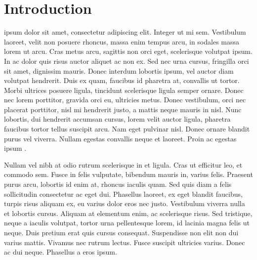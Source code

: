 \section{Introduction}\label{sec:10-intro}%
 ipsum dolor sit amet, consectetur adipiscing elit. Integer ut mi sem. Vestibulum laoreet, velit non posuere rhoncus, massa enim tempus arcu, in sodales massa lorem ut arcu. Cras metus arcu, sagittis non orci eget, scelerisque volutpat ipsum. In ac dolor quis risus auctor aliquet ac non ex. Sed nec urna cursus, fringilla orci sit amet, dignissim mauris. Donec interdum lobortis ipsum, vel auctor diam volutpat hendrerit. Duis ex quam, faucibus id pharetra at, convallis ut tortor. Morbi ultrices posuere ligula, tincidunt scelerisque ligula semper ornare. Donec nec lorem porttitor, gravida orci eu, ultricies metus. Donec vestibulum, orci nec placerat porttitor, nisl mi hendrerit justo, a mattis neque mauris in nisl. Nunc lobortis, dui hendrerit accumsan cursus, lorem velit auctor ligula, pharetra faucibus tortor tellus suscipit arcu. Nam eget pulvinar nisl. Donec ornare blandit purus vel viverra. Nullam egestas convallis neque et laoreet. Proin ac egestas ipsum \dummy.



Nullam vel nibh at odio rutrum scelerisque in et ligula. Cras ut efficitur leo, et commodo sem. Fusce in felis vulputate, bibendum mauris in, varius felis. Praesent purus arcu, lobortis id enim at, rhoncus iaculis quam. Sed quis diam a felis sollicitudin consectetur ac eget dui. Phasellus laoreet, ex eget blandit faucibus, turpis risus aliquam ex, eu varius dolor eros nec justo. Vestibulum viverra nulla et lobortis cursus. Aliquam at elementum enim, ac scelerisque risus. Sed tristique, neque a iaculis volutpat, tortor urna pellentesque lorem, id lacinia magna felis ut neque. Duis pretium erat quis cursus consequat. Suspendisse non elit non dui varius mattis. Vivamus nec rutrum lectus. Fusce suscipit ultricies varius. Donec ac dui neque. Phasellus a eros ipsum.

